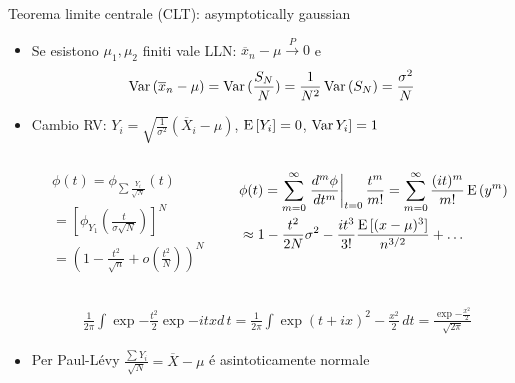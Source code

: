 \documentclass[asd-beamer.tex]{subfiles}
\begin{document}
\begin{frame}{Teorema limite centrale (CLT): asymptotically gaussian}
\begin{itemize}
\item Se esistono $\mu_1, \mu_2$ finiti vale LLN: $\overline{x}_n-\mu\xrightarrow{P}0$ e
\[\operatorname{Var}{(\overline{x}_n-\mu)}=\operatorname{Var}{(\frac{S_N}{N})}=\frac{1}{N^2}\operatorname{Var}{(S_N)}=\frac{\sigma^2}{N}\]%
\item Cambio RV: $Y_i=\sqrt{\frac{1}{\sigma^2}}(\overline{X}_i-\mu)$, $\operatorname{E}{[Y_i]}=0$, $\operatorname{Var}{Y_i]}=1$
\begin{columns}[T]
\begin{column}{0.4\textwidth}
\begin{align*}
&\phi(t)=\phi_{\sum\frac{Y_i}{\sqrt{N}}}(t)\\
&=[\phi_{Y_1}(\frac{t}{\sigma\sqrt{N}})]^N\\
&=(1-\frac{t^2}{\sqrt{n}}+o(\frac{t^2}{N}))^N
\end{align*}
	\end{column}
	\begin{column}{0.7\textwidth}
\begin{align*}
&\phi(t)=\sum_{m=0}^{\infty}\left.\frac{d^m\phi}{dt^m}\right|_{t=0}\frac{t^m}{m!}=\sum_{m=0}^{\infty}\frac{(it)^m}{m!}\operatorname{E}{(y^m)}\\
&\approx1-\frac{t^2}{2N}\sigma^2-\frac{it^3}{3!}\frac{\operatorname{E}{[(x-\mu)^3]}}{n^{3/2}}+\ldots
\end{align*}
	\end{column}
\end{columns}
\begin{align*}
&\frac{1}{2\pi}\int\exp{-\frac{t^2}{2}}\exp{-itx}d\,t=\frac{1}{2\pi}\int\exp{(t+ix)^2-\frac{x^2}{2}}\,dt=\frac{\exp{-\frac{x^2}{2}}}{\sqrt{2\pi}}
\end{align*}
\item Per Paul-L\'evy $\frac{\sum Y_i}{\sqrt{N}}=\overline{X}-\mu$ \'e asintoticamente normale
\end{itemize}
\end{frame}
\end{document}

